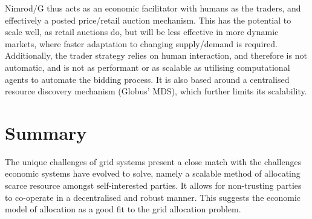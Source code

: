 Nimrod/G thus acts as an economic facilitator with humans as the traders, and
effectively a posted price/retail auction mechanism. This has the potential to
scale well, as retail auctions do, but will be less effective in more dynamic
markets, where faster adaptation to changing supply/demand is required.
Additionally, the trader strategy relies on human interaction, and therefore
is not automatic, and is not as performant or as scalable as
utilising computational agents to automate the bidding process. It is also
based around a centralised resource discovery mechanism (Globus' MDS), which
further limits its scalability.



\section{Summary}

The unique challenges of grid systems present a close match with the challenges
economic systems have evolved to solve, namely a scalable method of allocating
scarce resource amongst self-interested parties. It allows for non-trusting
parties to co-operate in a decentralised and robust manner. This suggests the
economic model of allocation as a good fit to the grid allocation problem.
